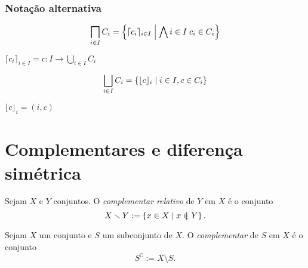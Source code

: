 

\subsubsection*{Notação alternativa}

\begin{equation*}
\prod_{i \in I} C_i = \set{\lceil c_i \rceil_{i \in I}}{\forall i \in I \; c_i \in C_i}
\end{equation*}

$\lceil c_i \rceil_{i \in I} = c: I \to \bigcup_{i \in I} C_i$

\begin{equation*}
\bigsqcup_{i \in I} C_i = \left\{{\lfloor c \rfloor_i}\;\middle\vert\;{i \in I, c \in C_i}\right\}
\end{equation*}

$\lfloor c \rfloor_i = (i,c)$




\section{Complementares e diferença simétrica}

\begin{definition}
Sejam $X$ e $Y$ conjuntos. O \emph{complementar relativo} de $Y$ em $X$ é o conjunto
	\begin{equation*}
	X \setminus Y := \set{x \in X}{x \notin Y}.
	\end{equation*}
\end{definition}

\begin{definition}
Sejam $X$ um conjunto e $S$ um subconjunto de $X$. O \emph{complementar} de $S$ em $X$ é o conjunto
	\begin{equation*}
	S^\complement := X \setminus S.
	\end{equation*}
\end{definition}

